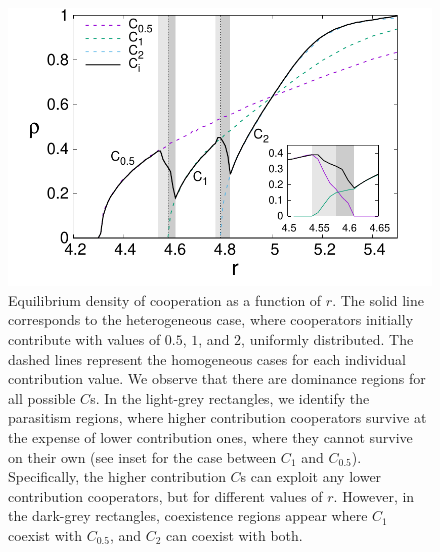 \documentclass[twocolumn,aps,amsmath,pre,floatfix,superscriptaddress]{revtex4-2}
\begin{document}
\begin{figure}[t]
    \centering
    \includegraphics[width=\linewidth]{coex-eps-converted-to.pdf}
    \caption{ Equilibrium density of cooperation as a function of $r$. The solid line corresponds to the heterogeneous case, where cooperators initially contribute with values of $0.5$, $1$, and $2$, uniformly distributed. The dashed lines represent the homogeneous cases for each individual contribution value. We observe that there are dominance regions for all possible $C$s. In the light-grey rectangles, we identify the parasitism regions, where  higher contribution cooperators survive at the expense of lower contribution ones, where they cannot survive on their own (see inset for the case between $C_1$ and $C_{0.5}$). 
    Specifically, the higher contribution $C$s can exploit any lower contribution cooperators, but for different values of $r$. However, in the dark-grey rectangles, coexistence regions appear where $C_1$ coexist with $C_{0.5}$, and $C_2$ can coexist with both. 
    }
    \label{coex2}
\end{figure}
\end{document}
